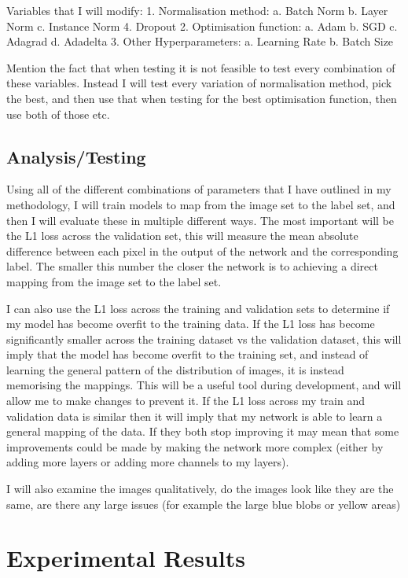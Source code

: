 \documentclass{UoYCSproject}
\begin{document}
Variables that I will modify:
1. Normalisation method:
a. Batch Norm
b. Layer Norm
c. Instance Norm
4. Dropout
2. Optimisation function:
a. Adam
b. SGD
c. Adagrad
d. Adadelta
3. Other Hyperparameters:
a. Learning Rate
b. Batch Size

Mention the fact that when testing it is not feasible to test every combination of these variables. Instead I will test every variation of normalisation method, pick the best, and then use that when testing for the best optimisation function, then use both of those etc. 

\section{Analysis/Testing}

Using all of the different combinations of parameters that I have outlined in my methodology, I will train models to map from the image set to the label set, and then I will evaluate these in multiple different ways. The most important will be the L1 loss across the validation set, this will measure the mean absolute difference between each pixel in the output of the network and the corresponding label. The smaller this number the closer the network is to achieving a direct mapping from the image set to the label set. 

I can also use the L1 loss across the training and validation sets to determine if my model has become overfit to the training data. If the L1 loss has become significantly smaller across the training dataset vs the validation dataset, this will imply that the model has become overfit to the training set, and instead of learning the general pattern of the distribution of images, it is instead memorising the mappings. This will be a useful tool during development, and will allow me to make changes to prevent it. If the L1 loss across my train and validation data is similar then it will imply that my network is able to learn a general mapping of the data. If they both stop improving it may mean that some improvements could be made by making the network more complex (either by adding more layers or adding more channels to my layers). 

I will also examine the images qualitatively, do the images look like they are the same, are there any large issues (for example the large blue blobs or yellow areas)

\newpage{}

\chapter{Experimental Results}
\end{document}
